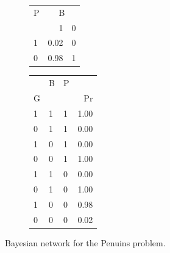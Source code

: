 \documentclass[
  10pt,
]{scrartcl}
\begin{document}
\begin{figure}[H]
{\begin{subfigure}[!ht]{0.4\textwidth}
\begin{tabular}{lrr}
\toprule
\multicolumn{1}{c}{P} & \multicolumn{2}{c}{B} \\
  & 1 & 0\\
\midrule
1 & 0.02 & 0\\
0 & 0.98 & 1\\
\bottomrule
\end{tabular}


\begin{tabular}{lllr}
\toprule
\multicolumn{1}{c}{} & \multicolumn{1}{c}{B} & \multicolumn{1}{c}{P} & \multicolumn{1}{c}{} \\
G &  &  & Pr\\
\midrule
1 & 1 & 1 & 1.00\\
0 & 1 & 1 & 0.00\\
1 & 0 & 1 & 0.00\\
0 & 0 & 1 & 1.00\\
1 & 1 & 0 & 0.00\\
0 & 1 & 0 & 1.00\\
1 & 0 & 0 & 0.98\\
0 & 0 & 0 & 0.02\\
\bottomrule
\end{tabular}
\end{subfigure}}
\caption{Bayesian network for the Penuins problem.}
\label{fig:BGP}
\end{figure}
\end{document}
